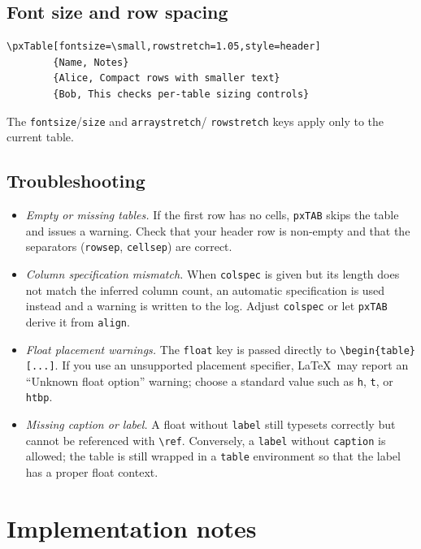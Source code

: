 \documentclass[11pt,a4paper]{article}
\begin{document}
\subsection{Font size and row spacing}

\begin{verbatim}
\pxTable[fontsize=\small,rowstretch=1.05,style=header]
        {Name, Notes}
        {Alice, Compact rows with smaller text}
        {Bob, This checks per-table sizing controls}
\end{verbatim}

The \texttt{fontsize}/\texttt{size} and \texttt{arraystretch}/%
\texttt{rowstretch} keys apply only to the current table.

\subsection{Troubleshooting}

\begin{itemize}
  \item \emph{Empty or missing tables.}  If the first row has no cells,
    \texttt{pxTAB} skips the table and issues a warning.  Check that
    your header row is non-empty and that the separators
    (\texttt{rowsep}, \texttt{cellsep}) are correct.
  \item \emph{Column specification mismatch.}  When \texttt{colspec} is
    given but its length does not match the inferred column count, an
    automatic specification is used instead and a warning is written to
    the log.  Adjust \texttt{colspec} or let \texttt{pxTAB} derive it
    from \texttt{align}.
  \item \emph{Float placement warnings.}  The \texttt{float} key is
    passed directly to \verb|\begin{table}[...]|.  If you use an
    unsupported placement specifier, \LaTeX\ may report an ``Unknown
    float option'' warning; choose a standard value such as
    \texttt{h}, \texttt{t}, or \texttt{htbp}.
  \item \emph{Missing caption or label.}  A float without \texttt{label}
    still typesets correctly but cannot be referenced with
    \verb|\ref|.  Conversely, a \texttt{label} without \texttt{caption}
    is allowed; the table is still wrapped in a \texttt{table}
    environment so that the label has a proper float context.
\end{itemize}

\section{Implementation notes}
\end{document}
